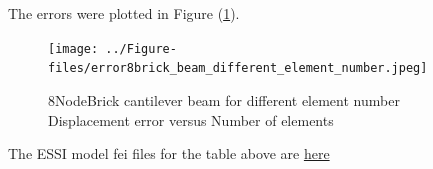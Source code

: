 \documentclass[fleqn,11pt]{article}
\begin{document}
The errors were plotted in Figure (\ref{fig error 8NodeBrick cantilever beam for different element number}).
\begin{figure}[H]
    \centering
    \texttt{[image: ../Figure-files/error8brick\_beam\_different\_element\_number.jpeg]}
  \captionsetup{justification=centering,margin=3cm}
  \caption{8NodeBrick cantilever beam for different element number\\
    Displacement error   versus   Number of elements}
  \label{fig error 8NodeBrick cantilever beam for different element number}
\end{figure}







The ESSI model fei files for the table above are \href{https://github.com/yuan-energy/ESSI_Verification/blob/master/8NodeBrick/cantilever_different_element_number/cantilever_different_element_number.tar.gz?raw=true}{here}








\end{document}
